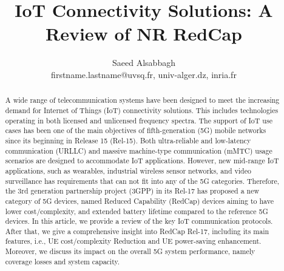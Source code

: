 \documentclass[]{IEEEtran}
\begin{document}
\title{IoT Connectivity Solutions: A Review of NR RedCap}


\author{Saeed Alsabbagh 


firstname.lastname@uvsq.fr, univ-alger.dz, 
inria.fr
\vspace{0mm}
}


\maketitle

\begin{abstract}
A wide range of telecommunication systems have been designed to meet the increasing demand for Internet of Things (IoT) connectivity solutions.
This includes technologies operating in both licensed and unlicensed frequency spectra.
The support of IoT use cases has been one of the main objectives of fifth-generation (5G) mobile networks since its beginning in Release 15 (Rel-15).
Both ultra-reliable and low-latency communication (URLLC) and massive machine-type communication (mMTC) usage scenarios are designed to accommodate IoT applications.
However, new mid-range IoT applications, such as wearables, industrial wireless sensor networks, and video surveillance has requirements that can not fit into any of the  5G categories.
Therefore, the 3rd generation partnership project (3GPP) in its Rel-17 has proposed a new category of 5G devices, named Reduced Capability (RedCap) devices aiming to have lower cost/complexity, and extended battery lifetime compared to the reference 5G devices.
In this article, we provide a review of the key IoT communication protocols.
After that, we give a comprehensive insight into RedCap Rel-17, including its main features, i.e., UE cost/complexity Reduction and UE power-saving enhancement.
Moreover, we discuss its impact on the overall 5G system performance, namely coverage losses and system capacity.
\end{abstract}
\end{document}
